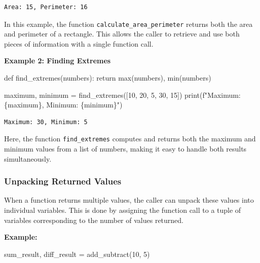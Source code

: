 \documentclass[
  letterpaper,
  DIV=11,
  numbers=noendperiod]{scrreprt}
\newenvironment{Shaded}{\begin{snugshade}}{\end{snugshade}}
\newcommand{\BuiltInTok}[1]{\textcolor[rgb]{0.00,0.23,0.31}{#1}}
\newcommand{\ControlFlowTok}[1]{\textcolor[rgb]{0.00,0.23,0.31}{#1}}
\newcommand{\DecValTok}[1]{\textcolor[rgb]{0.68,0.00,0.00}{#1}}
\newcommand{\KeywordTok}[1]{\textcolor[rgb]{0.00,0.23,0.31}{#1}}
\newcommand{\NormalTok}[1]{\textcolor[rgb]{0.00,0.23,0.31}{#1}}
\newcommand{\OperatorTok}[1]{\textcolor[rgb]{0.37,0.37,0.37}{#1}}
\newcommand{\SpecialCharTok}[1]{\textcolor[rgb]{0.37,0.37,0.37}{#1}}
\newcommand{\SpecialStringTok}[1]{\textcolor[rgb]{0.13,0.47,0.30}{#1}}
\begin{document}
\begin{verbatim}
Area: 15, Perimeter: 16
\end{verbatim}

In this example, the function \texttt{calculate\_area\_perimeter}
returns both the area and perimeter of a rectangle. This allows the
caller to retrieve and use both pieces of information with a single
function call.

\textbf{Example 2: Finding Extremes}

\begin{Shaded}
\begin{Highlighting}[]
\KeywordTok{def}\NormalTok{ find\_extremes(numbers):}
    \ControlFlowTok{return} \BuiltInTok{max}\NormalTok{(numbers), }\BuiltInTok{min}\NormalTok{(numbers)}

\NormalTok{maximum, minimum }\OperatorTok{=}\NormalTok{ find\_extremes([}\DecValTok{10}\NormalTok{, }\DecValTok{20}\NormalTok{, }\DecValTok{5}\NormalTok{, }\DecValTok{30}\NormalTok{, }\DecValTok{15}\NormalTok{])}
\BuiltInTok{print}\NormalTok{(}\SpecialStringTok{f"Maximum: }\SpecialCharTok{\{}\NormalTok{maximum}\SpecialCharTok{\}}\SpecialStringTok{, Minimum: }\SpecialCharTok{\{}\NormalTok{minimum}\SpecialCharTok{\}}\SpecialStringTok{"}\NormalTok{)}
\end{Highlighting}
\end{Shaded}

\begin{verbatim}
Maximum: 30, Minimum: 5
\end{verbatim}

Here, the function \texttt{find\_extremes} computes and returns both the
maximum and minimum values from a list of numbers, making it easy to
handle both results simultaneously.

\hypertarget{unpacking-returned-values}{%
\subsubsection{Unpacking Returned
Values}\label{unpacking-returned-values}}

When a function returns multiple values, the caller can unpack these
values into individual variables. This is done by assigning the function
call to a tuple of variables corresponding to the number of values
returned.

\textbf{Example:}

\begin{Shaded}
\begin{Highlighting}[]
\NormalTok{sum\_result, diff\_result }\OperatorTok{=}\NormalTok{ add\_subtract(}\DecValTok{10}\NormalTok{, }\DecValTok{5}\NormalTok{)}
\end{Highlighting}
\end{Shaded}
\end{document}
